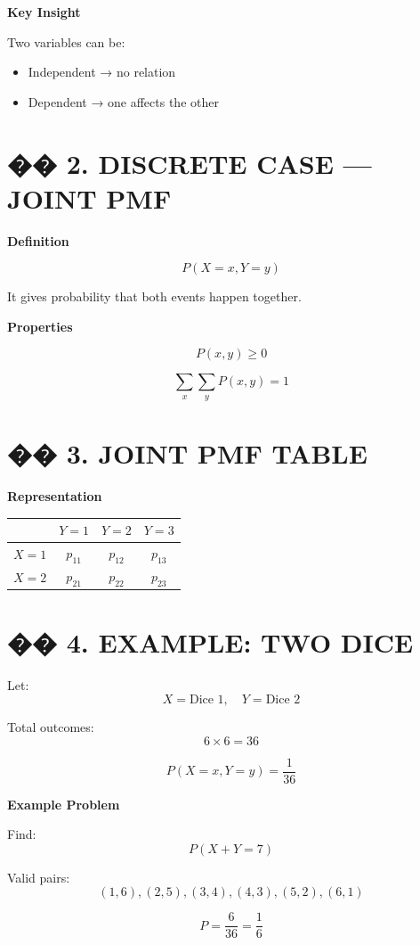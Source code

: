 \documentclass[12pt]{article}
\begin{document}
\textbf{Key Insight}

Two variables can be:
\begin{itemize}
\item Independent → no relation
\item Dependent → one affects the other
\end{itemize}

\section*{�� 2. DISCRETE CASE — JOINT PMF}

\textbf{Definition}

\[
P(X = x, Y = y)
\]

It gives probability that both events happen together.

\textbf{Properties}

\[
P(x,y) \geq 0
\]

\[
\sum_x \sum_y P(x,y) = 1
\]

\section*{�� 3. JOINT PMF TABLE}

\textbf{Representation}

\begin{center}
\begin{tabular}{c|ccc}
 & $Y=1$ & $Y=2$ & $Y=3$ \\
\hline
$X=1$ & $p_{11}$ & $p_{12}$ & $p_{13}$ \\
$X=2$ & $p_{21}$ & $p_{22}$ & $p_{23}$ \\
\end{tabular}
\end{center}

\section*{�� 4. EXAMPLE: TWO DICE}

Let:
\[
X = \text{Dice 1}, \quad Y = \text{Dice 2}
\]

Total outcomes:
\[
6 \times 6 = 36
\]

\[
P(X=x, Y=y) = \frac{1}{36}
\]

\textbf{Example Problem}

Find:
\[
P(X + Y = 7)
\]

Valid pairs:
\[
(1,6), (2,5), (3,4), (4,3), (5,2), (6,1)
\]

\[
P = \frac{6}{36} = \frac{1}{6}
\]
\end{document}
